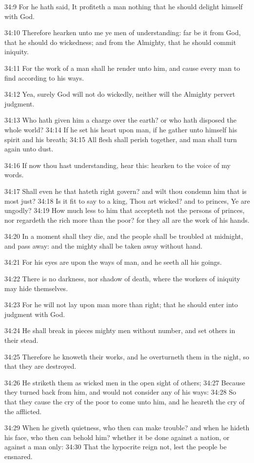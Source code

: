 34:9 For he hath said, It profiteth a man nothing that he should
delight himself with God.

34:10 Therefore hearken unto me ye men of understanding: far be it
from God, that he should do wickedness; and from the Almighty, that he
should commit iniquity.

34:11 For the work of a man shall he render unto him, and cause every
man to find according to his ways.

34:12 Yea, surely God will not do wickedly, neither will the Almighty
pervert judgment.

34:13 Who hath given him a charge over the earth? or who hath disposed
the whole world?  34:14 If he set his heart upon man, if he gather
unto himself his spirit and his breath; 34:15 All flesh shall perish
together, and man shall turn again unto dust.

34:16 If now thou hast understanding, hear this: hearken to the voice
of my words.

34:17 Shall even he that hateth right govern? and wilt thou condemn
him that is most just?  34:18 Is it fit to say to a king, Thou art
wicked? and to princes, Ye are ungodly?  34:19 How much less to him
that accepteth not the persons of princes, nor regardeth the rich more
than the poor? for they all are the work of his hands.

34:20 In a moment shall they die, and the people shall be troubled at
midnight, and pass away: and the mighty shall be taken away without
hand.

34:21 For his eyes are upon the ways of man, and he seeth all his
goings.

34:22 There is no darkness, nor shadow of death, where the workers of
iniquity may hide themselves.

34:23 For he will not lay upon man more than right; that he should
enter into judgment with God.

34:24 He shall break in pieces mighty men without number, and set
others in their stead.

34:25 Therefore he knoweth their works, and he overturneth them in the
night, so that they are destroyed.

34:26 He striketh them as wicked men in the open sight of others;
34:27 Because they turned back from him, and would not consider any of
his ways: 34:28 So that they cause the cry of the poor to come unto
him, and he heareth the cry of the afflicted.

34:29 When he giveth quietness, who then can make trouble? and when he
hideth his face, who then can behold him? whether it be done against a
nation, or against a man only: 34:30 That the hypocrite reign not,
lest the people be ensnared.

